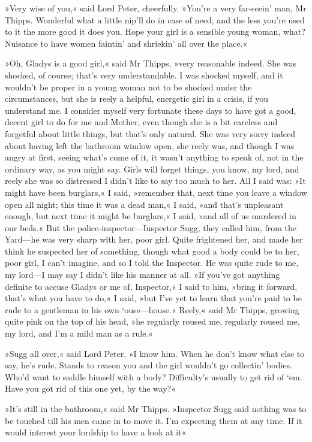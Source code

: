 »Very wise of you,« said Lord Peter, cheerfully. »You're a very far-seein' man, Mr Thipps. Wonderful what a little nip'll do in case of need, and the less you're used to it the more good it does you. Hope your girl is a sensible young woman, what? Nuisance to have women faintin' and shriekin' all over the place.«

»Oh, Gladys is a good girl,« said Mr Thipps, »very reasonable indeed. She was shocked, of course; that's very understandable. I was shocked myself, and it wouldn't be proper in a young woman not to be shocked under the circumstances, but she is reely a helpful, energetic girl in a crisis, if you understand me. I consider myself very fortunate these days to have got a good, decent girl to do for me and Mother, even though she is a bit careless and forgetful about little things, but that's only natural. She was very sorry indeed about having left the bathroom window open, she reely was, and though I was angry at first, seeing what's come of it, it wasn't anything to speak of, not in the ordinary way, as you might say. Girls will forget things, you know, my lord, and reely she was so distressed I didn't like to say too much to her. All I said was: »It might have been burglars,« I said, »remember that, next time you leave a window open all night; this time it was a dead man,« I said, »and that's unpleasant enough, but next time it might be burglars,« I said, »and all of us murdered in our beds.« But the police-inspector—Inspector Sugg, they called him, from the Yard—he was very sharp with her, poor girl. Quite frightened her, and made her think he suspected her of something, though what good a body could be to her, poor girl, I can't imagine, and so I told the Inspector. He was quite rude to me, my lord—I may say I didn't like his manner at all. »If you've got anything definite to accuse Gladys or me of, Inspector,« I said to him, »bring it forward, that's what you have to do,« I said, »but I've yet to learn that you're paid to be rude to a gentleman in his own `ouse—house.« Reely,« said Mr Thipps, growing quite pink on the top of his head, »he regularly roused me, regularly roused me, my lord, and I'm a mild man as a rule.«

»Sugg all over,« said Lord Peter. »I know him. When he don't know what else to say, he's rude. Stands to reason you and the girl wouldn't go collectin' bodies. Who'd want to saddle himself with a body? Difficulty's usually to get rid of `em. Have you got rid of this one yet, by the way?«

»It's still in the bathroom,« said Mr Thipps. »Inspector Sugg said nothing was to be touched till his men came in to move it. I'm expecting them at any time. If it would interest your lordship to have a look at it\longdash«

